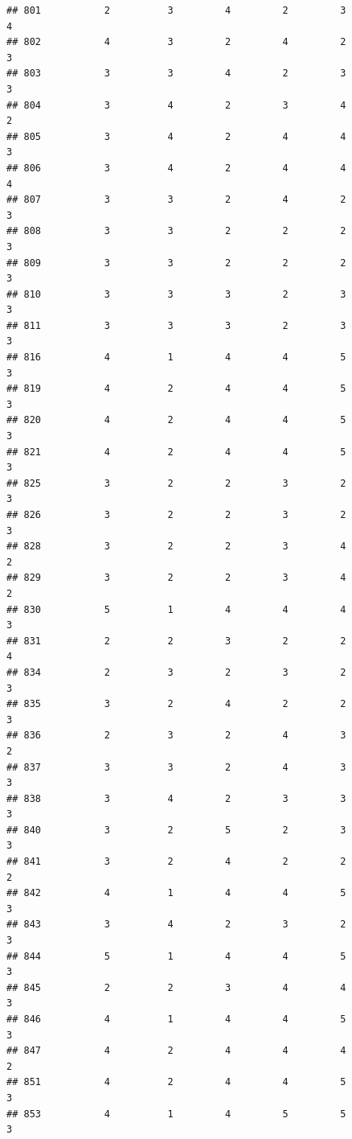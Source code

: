 \documentclass[
]{article}
\begin{document}
\begin{verbatim}
## 801           2          3         4         2         3             4
## 802           4          3         2         4         2             3
## 803           3          3         4         2         3             3
## 804           3          4         2         3         4             2
## 805           3          4         2         4         4             3
## 806           3          4         2         4         4             4
## 807           3          3         2         4         2             3
## 808           3          3         2         2         2             3
## 809           3          3         2         2         2             3
## 810           3          3         3         2         3             3
## 811           3          3         3         2         3             3
## 816           4          1         4         4         5             3
## 819           4          2         4         4         5             3
## 820           4          2         4         4         5             3
## 821           4          2         4         4         5             3
## 825           3          2         2         3         2             3
## 826           3          2         2         3         2             3
## 828           3          2         2         3         4             2
## 829           3          2         2         3         4             2
## 830           5          1         4         4         4             3
## 831           2          2         3         2         2             4
## 834           2          3         2         3         2             3
## 835           3          2         4         2         2             3
## 836           2          3         2         4         3             2
## 837           3          3         2         4         3             3
## 838           3          4         2         3         3             3
## 840           3          2         5         2         3             3
## 841           3          2         4         2         2             2
## 842           4          1         4         4         5             3
## 843           3          4         2         3         2             3
## 844           5          1         4         4         5             3
## 845           2          2         3         4         4             3
## 846           4          1         4         4         5             3
## 847           4          2         4         4         4             2
## 851           4          2         4         4         5             3
## 853           4          1         4         5         5             3

\end{verbatim}
\end{document}
